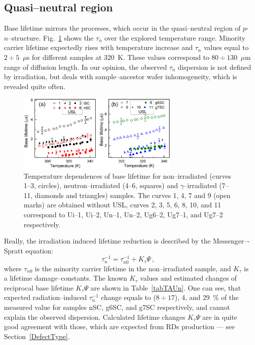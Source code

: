 \documentclass[aip,jap, amsmath,amssymb,reprint]{revtex4-1}
\begin{document}
\subsection{Quasi--neutral region\label{Base}}

Base lifetime mirrors the processes, which occur in the quasi--neutral region  of $p$-$n$--structure.
Fig.~\ref{fig_TAUr} shows the  $\tau_n$  over the explored temperature range.
Minority carrier lifetime expectedly rises with temperature increase and
$\tau_n$ values equal to $2\div5$~$\mu$s for different samples at 320~K.
These values correspond to $80\div130$~$\mu$m range of diffusion length.
In our opinion, the observed $\tau_n$ dispersion is not defined by irradiation, but deals with sample--ancestor wafer inhomogeneity, which is revealed
quite often.\cite{Oxide:Chen,Oxide_Schon}

\begin{figure}
\includegraphics[width=0.7\textwidth]{fig_7ab}%
\caption{\label{fig_TAUr}
Temperature dependences of base lifetime for non--irradiated (curves 1--3, circles),
neutron--irradiated (4--6, squares) and $\gamma$--irradiated (7--11, diamonds and triangles) samples.
The curves 1, 4, 7 and 9 (open marks) are obtained without USL,
curves 2, 3, 5, 6, 8, 10, and 11 correspond to
Ui--1, Ui--2, Un--1, Un--2, Ug6--2, Ug7--1, and Ug7--2 respectively.
}%
\end{figure}

Really, the irradiation induced lifetime reduction is described by the Messenger–-Spratt equation:\cite{Markvart}
\begin{equation}
\label{eqMS}
\tau_n^{-1}=\tau_{n0}^{-1}+K_\tau\Psi\,,
\end{equation}
where $\tau_{n0}$ is the minority carrier lifetime in the non--irradiated sample,
and $K_\tau$ is a lifetime damage--constants.
The known $K_\tau$ values and estimated changes of reciprocal base lifetime $K_\tau\Psi$ are shown in Table~\ref{tabTAUn}.
One can see, that expected radiation--induced $\tau_n^{-1}$ change equals to ($8\div17$), 4, and 29~\% of
the measured value for samples nSC, g6SC, and g7SC respectively, and cannot explain the observed dispersion.
Calculated lifetime changes $K_\tau\Psi$ are in quite good agreement with those, which are expected from RDs production --- see Section~\ref{DefectType}.
\end{document}
